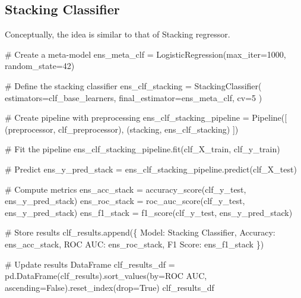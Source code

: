 \documentclass[
  letterpaper,
  DIV=11,
  numbers=noendperiod]{scrreprt}
\newenvironment{Shaded}{\begin{snugshade}}{\end{snugshade}}
\newcommand{\CommentTok}[1]{\textcolor[rgb]{0.37,0.37,0.37}{#1}}
\newcommand{\DecValTok}[1]{\textcolor[rgb]{0.68,0.00,0.00}{#1}}
\newcommand{\NormalTok}[1]{\textcolor[rgb]{0.00,0.23,0.31}{#1}}
\newcommand{\OperatorTok}[1]{\textcolor[rgb]{0.37,0.37,0.37}{#1}}
\newcommand{\StringTok}[1]{\textcolor[rgb]{0.13,0.47,0.30}{#1}}
\newcommand{\VariableTok}[1]{\textcolor[rgb]{0.07,0.07,0.07}{#1}}
\begin{document}
\subsection{Stacking Classifier}\label{stacking-classifier}

Conceptually, the idea is similar to that of Stacking regressor.

\begin{Shaded}
\begin{Highlighting}[]
\CommentTok{\# Create a meta{-}model}
\NormalTok{ens\_meta\_clf }\OperatorTok{=}\NormalTok{ LogisticRegression(max\_iter}\OperatorTok{=}\DecValTok{1000}\NormalTok{, random\_state}\OperatorTok{=}\DecValTok{42}\NormalTok{)}

\CommentTok{\# Define the stacking classifier}
\NormalTok{ens\_clf\_stacking }\OperatorTok{=}\NormalTok{ StackingClassifier(}
\NormalTok{    estimators}\OperatorTok{=}\NormalTok{clf\_base\_learners,}
\NormalTok{    final\_estimator}\OperatorTok{=}\NormalTok{ens\_meta\_clf,}
\NormalTok{    cv}\OperatorTok{=}\DecValTok{5}
\NormalTok{)}

\CommentTok{\# Create pipeline with preprocessing}
\NormalTok{ens\_clf\_stacking\_pipeline }\OperatorTok{=}\NormalTok{ Pipeline([}
\NormalTok{    (}\StringTok{\textquotesingle{}preprocessor\textquotesingle{}}\NormalTok{, clf\_preprocessor),}
\NormalTok{    (}\StringTok{\textquotesingle{}stacking\textquotesingle{}}\NormalTok{, ens\_clf\_stacking)}
\NormalTok{])}

\CommentTok{\# Fit the pipeline}
\NormalTok{ens\_clf\_stacking\_pipeline.fit(clf\_X\_train, clf\_y\_train)}

\CommentTok{\# Predict}
\NormalTok{ens\_y\_pred\_stack }\OperatorTok{=}\NormalTok{ ens\_clf\_stacking\_pipeline.predict(clf\_X\_test)}

\CommentTok{\# Compute metrics}
\NormalTok{ens\_acc\_stack }\OperatorTok{=}\NormalTok{ accuracy\_score(clf\_y\_test, ens\_y\_pred\_stack)}
\NormalTok{ens\_roc\_stack }\OperatorTok{=}\NormalTok{ roc\_auc\_score(clf\_y\_test, ens\_y\_pred\_stack)}
\NormalTok{ens\_f1\_stack }\OperatorTok{=}\NormalTok{ f1\_score(clf\_y\_test, ens\_y\_pred\_stack)}

\CommentTok{\# Store results}
\NormalTok{clf\_results.append(\{}
    \StringTok{\textquotesingle{}Model\textquotesingle{}}\NormalTok{: }\StringTok{\textquotesingle{}Stacking Classifier\textquotesingle{}}\NormalTok{,}
    \StringTok{\textquotesingle{}Accuracy\textquotesingle{}}\NormalTok{: ens\_acc\_stack,}
    \StringTok{\textquotesingle{}ROC AUC\textquotesingle{}}\NormalTok{: ens\_roc\_stack,}
    \StringTok{\textquotesingle{}F1 Score\textquotesingle{}}\NormalTok{: ens\_f1\_stack}
\NormalTok{\})}

\CommentTok{\# Update results DataFrame}
\NormalTok{clf\_results\_df }\OperatorTok{=}\NormalTok{ pd.DataFrame(clf\_results).sort\_values(by}\OperatorTok{=}\StringTok{\textquotesingle{}ROC AUC\textquotesingle{}}\NormalTok{, ascending}\OperatorTok{=}\VariableTok{False}\NormalTok{).reset\_index(drop}\OperatorTok{=}\VariableTok{True}\NormalTok{)}
\NormalTok{clf\_results\_df}
\end{Highlighting}
\end{Shaded}
\end{document}
